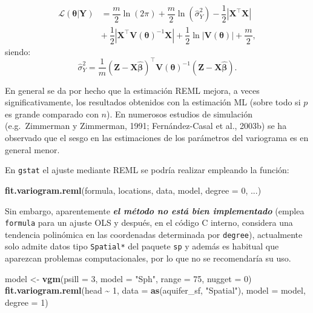 \documentclass[
]{book}
\newenvironment{Shaded}{\begin{snugshade}}{\end{snugshade}}
\newcommand{\AttributeTok}[1]{\textcolor[rgb]{0.13,0.29,0.53}{#1}}
\newcommand{\DecValTok}[1]{\textcolor[rgb]{0.00,0.00,0.81}{#1}}
\newcommand{\FunctionTok}[1]{\textcolor[rgb]{0.13,0.29,0.53}{\textbf{#1}}}
\newcommand{\NormalTok}[1]{#1}
\newcommand{\OtherTok}[1]{\textcolor[rgb]{0.56,0.35,0.01}{#1}}
\newcommand{\SpecialCharTok}[1]{\textcolor[rgb]{0.81,0.36,0.00}{\textbf{#1}}}
\newcommand{\StringTok}[1]{\textcolor[rgb]{0.31,0.60,0.02}{#1}}
\theoremstyle{break}
\theoremstyle{definition}
\theoremstyle{definition}
\theoremstyle{definition}
\theoremstyle{definition}
\theoremstyle{remark}
\begin{document}
\[\begin{aligned}
\mathcal{L}(\boldsymbol{\theta}\left| \mathbf{Y}\right. ) 
& = \dfrac{m}{2} \ln (2\pi ) + \dfrac{m}{2} \ln (\hat{\sigma}_{Y}^2) -\dfrac{1}{2} \left| \mathbf{X}^\top\mathbf{X}\right|  \\
& + \ \dfrac{1}{2} \left| \mathbf{X}^\top\mathbf{V}(\boldsymbol{\theta})^{-1}
\mathbf{X}\right| +\dfrac{1}{2} \ln \left| \mathbf{V}(\boldsymbol{\theta})\right|
+\dfrac{m}{2} ,\end{aligned}\]
siendo:
\[\hat{\sigma }_{Y}^2 =\dfrac{1}{m}(\mathbf{Z}-\mathbf{X}\hat{\boldsymbol{\beta}}
)^\top \mathbf{V}(\boldsymbol{\theta})^{-1}(\mathbf{Z}-\mathbf{X}\hat{\boldsymbol{\beta}}).\]

En general se da por hecho que la estimación REML mejora, a veces significativamente, los resultados obtenidos con la estimación ML (sobre todo si \(p\) es grande comparado con \(n\)).
En numerosos estudios de simulación (e.g.~Zimmerman y Zimmerman, 1991; Fernández-Casal et al., 2003b) se ha observado que el sesgo en las estimaciones de los parámetros del variograma es en general menor.

En \texttt{gstat} el ajuste mediante REML se podría realizar empleando la función:

\begin{Shaded}
\begin{Highlighting}[]
\FunctionTok{fit.variogram.reml}\NormalTok{(formula, locations, data, model, }\AttributeTok{degree =} \DecValTok{0}\NormalTok{, ...)}
\end{Highlighting}
\end{Shaded}

Sin embargo, aparentemente \textbf{\emph{el método no está bien implementado}} (emplea \texttt{formula} para un ajuste OLS y después, en el código C interno, considera una tendencia polinómica en las coordenadas determinada por \texttt{degree}), actualmente solo admite datos tipo \texttt{Spatial*} del paquete \texttt{sp} y además es habitual que aparezcan problemas computacionales, por lo que no se recomendaría su uso.

\begin{Shaded}
\begin{Highlighting}[]
\NormalTok{model }\OtherTok{\textless{}{-}} \FunctionTok{vgm}\NormalTok{(}\AttributeTok{psill =} \DecValTok{3}\NormalTok{, }\AttributeTok{model =} \StringTok{"Sph"}\NormalTok{, }\AttributeTok{range =} \DecValTok{75}\NormalTok{, }\AttributeTok{nugget =} \DecValTok{0}\NormalTok{)}
\FunctionTok{fit.variogram.reml}\NormalTok{(head }\SpecialCharTok{\textasciitilde{}} \DecValTok{1}\NormalTok{, }\AttributeTok{data =} \FunctionTok{as}\NormalTok{(aquifer\_sf, }\StringTok{"Spatial"}\NormalTok{), }\AttributeTok{model =}\NormalTok{ model, }\AttributeTok{degree =} \DecValTok{1}\NormalTok{)}
\end{Highlighting}
\end{Shaded}
\end{document}
